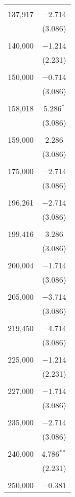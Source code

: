 \documentclass[12pt,english]{article}
\begin{document}
\begin{table}[!htbp]
\begin{tabular}{@{\extracolsep{5pt}}lc}
  & \\ 
 137,917 & $-$2.714 \\ 
  & (3.086) \\ 
  & \\ 
 140,000 & $-$1.214 \\ 
  & (2.231) \\ 
  & \\ 
 150,000 & $-$0.714 \\ 
  & (3.086) \\ 
  & \\ 
 158,018 & 5.286$^{*}$ \\ 
  & (3.086) \\ 
  & \\ 
 159,000 & 2.286 \\ 
  & (3.086) \\ 
  & \\ 
 175,000 & $-$2.714 \\ 
  & (3.086) \\ 
  & \\ 
 196,261 & $-$2.714 \\ 
  & (3.086) \\ 
  & \\ 
 199,416 & 3.286 \\ 
  & (3.086) \\ 
  & \\ 
 200,004 & $-$1.714 \\ 
  & (3.086) \\ 
  & \\ 
 205,000 & $-$3.714 \\ 
  & (3.086) \\ 
  & \\ 
 219,450 & $-$4.714 \\ 
  & (3.086) \\ 
  & \\ 
 225,000 & $-$1.214 \\ 
  & (2.231) \\ 
  & \\ 
 227,000 & $-$1.714 \\ 
  & (3.086) \\ 
  & \\ 
 235,000 & $-$2.714 \\ 
  & (3.086) \\ 
  & \\ 
 240,000 & 4.786$^{**}$ \\ 
  & (2.231) \\ 
  & \\ 
 250,000 & $-$0.381 \\ 

\end{tabular}
\end{table}
\end{document}
